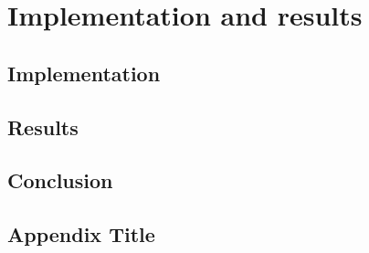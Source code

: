 \documentclass[12pt, twoside]{report}
\begin{document}
\part{Implementation and results}

\chapter{Implementation}


\chapter{Results}

 
\chapter{Conclusion}


\appendix
\chapter{Appendix Title}


\printbibliography[heading=bibintoc]
\end{document}
